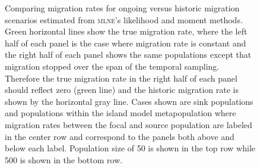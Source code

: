 \begin{figure}[ht]
\centering
{}
\caption[Comparing migration rates for ongoing versus historic migration scenarios.]{Comparing migration rates for ongoing versus historic migration scenarios estimated from \textsc{mlne}'s likelihood and moment methods. Green horizontal lines show the true migration rate, where the left half of each panel is the case where migration rate is constant and the right half of each panel shows the same populations except that migration stopped over the span of the temporal sampling. Therefore the true migration rate in the right half of each panel should reflect zero (green line) and the historic migration rate is shown by the horizontal gray line. Cases shown are sink populations and populations within the island model metapopulation where migration rates between the focal and source population are labeled in the center row and correspond to the panels both above and below each label. Population size of 50 is shown in the top row while 500 is shown in the bottom row.}
\label{fig:supp_compmig}
\end{figure}